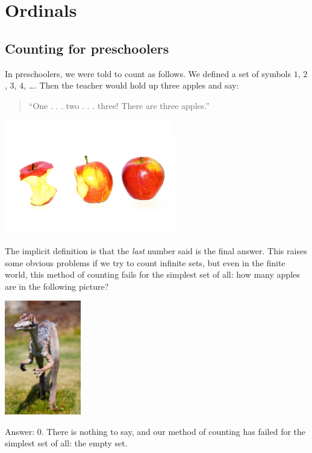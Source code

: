 \chapter{Ordinals}
\section{Counting for preschoolers}
In preschoolers, we were told to count as follows.
We defined a set of symbols $1$, $2$, $3$, $4$, \dots.
Then the teacher would hold up three apples and say:
\begin{quote}
	``One . . . two . . . three!  There are three apples.''
\end{quote}

\begin{center}
	\includegraphics[height=5cm]{media/three-apples.jpg}
\end{center}


The implicit definition is that the \emph{last} number said is the final answer.
This raises some obvious problems if we try to count infinite sets,
but even in the finite world,
this method of counting fails for the simplest set of all:
how many apples are in the following picture?

\begin{center}
	\includegraphics[height=5cm]{media/velociraptor.jpg}
\end{center}

Answer: $0$. There is nothing to say, and our method of counting has failed
for the simplest set of all: the empty set.

